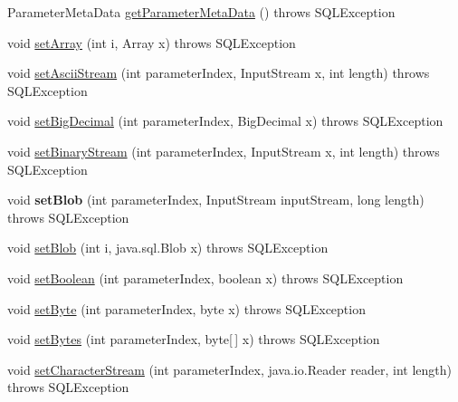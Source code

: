 \begin{DoxyCompactItemize}
\item 
Parameter\+Meta\+Data \mbox{\hyperlink{classcom_1_1mysql_1_1jdbc_1_1_prepared_statement_aec23fbfe8b08dd9281ff9757dc896101}{get\+Parameter\+Meta\+Data}} ()  throws S\+Q\+L\+Exception 
\item 
void \mbox{\hyperlink{classcom_1_1mysql_1_1jdbc_1_1_prepared_statement_a435eccbc94fa43a060e987fa8236fbe8}{set\+Array}} (int i, Array x)  throws S\+Q\+L\+Exception 
\item 
void \mbox{\hyperlink{classcom_1_1mysql_1_1jdbc_1_1_prepared_statement_ae3612d6b5fc893fa6e24ec026c40a100}{set\+Ascii\+Stream}} (int parameter\+Index, Input\+Stream x, int length)  throws S\+Q\+L\+Exception 
\item 
void \mbox{\hyperlink{classcom_1_1mysql_1_1jdbc_1_1_prepared_statement_ab398b97a7a8e7b77fa5d2ad422897cd7}{set\+Big\+Decimal}} (int parameter\+Index, Big\+Decimal x)  throws S\+Q\+L\+Exception 
\item 
void \mbox{\hyperlink{classcom_1_1mysql_1_1jdbc_1_1_prepared_statement_a230dbbbaa17cdab8c8a70125a6b8bbca}{set\+Binary\+Stream}} (int parameter\+Index, Input\+Stream x, int length)  throws S\+Q\+L\+Exception 
\item 
\mbox{\label{classcom_1_1mysql_1_1jdbc_1_1_prepared_statement_a399d25c1005b98c41eae016490357fcc}} 
void {\bfseries set\+Blob} (int parameter\+Index, Input\+Stream input\+Stream, long length)  throws S\+Q\+L\+Exception 
\item 
void \mbox{\hyperlink{classcom_1_1mysql_1_1jdbc_1_1_prepared_statement_a923cc59072cb8539196d7288f1830f0d}{set\+Blob}} (int i, java.\+sql.\+Blob x)  throws S\+Q\+L\+Exception 
\item 
void \mbox{\hyperlink{classcom_1_1mysql_1_1jdbc_1_1_prepared_statement_a9f0e5dd8b1cae6d2f116ae694577b2ce}{set\+Boolean}} (int parameter\+Index, boolean x)  throws S\+Q\+L\+Exception 
\item 
void \mbox{\hyperlink{classcom_1_1mysql_1_1jdbc_1_1_prepared_statement_a77b76109f1a5e97036a8a82de590efc5}{set\+Byte}} (int parameter\+Index, byte x)  throws S\+Q\+L\+Exception 
\item 
void \mbox{\hyperlink{classcom_1_1mysql_1_1jdbc_1_1_prepared_statement_aaaac7a11d71f1c60bc57f96271582061}{set\+Bytes}} (int parameter\+Index, byte\mbox{[}$\,$\mbox{]} x)  throws S\+Q\+L\+Exception 
\item 
void \mbox{\hyperlink{classcom_1_1mysql_1_1jdbc_1_1_prepared_statement_a3653eef6d3825664b0dd3f0adbe8288c}{set\+Character\+Stream}} (int parameter\+Index, java.\+io.\+Reader reader, int length)  throws S\+Q\+L\+Exception 

\end{DoxyCompactItemize}

